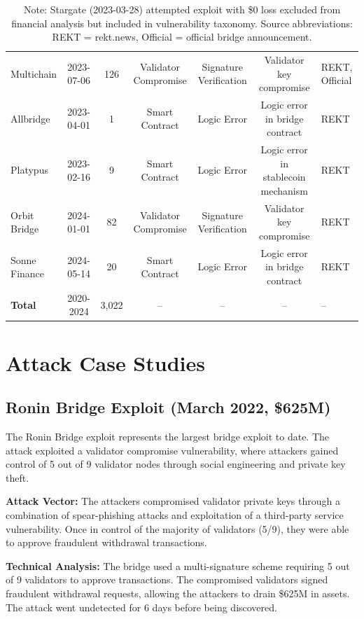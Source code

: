 \documentclass[runningheads]{llncs}
\begin{document}
\begin{table}[!ht]
\begin{tabular}{lcccccp{3.5cm}}
        Multichain & 2023-07-06 & 126 & Validator Compromise & Signature Verification & Validator key compromise & REKT, Official \\
        Allbridge & 2023-04-01 & 1 & Smart Contract & Logic Error & Logic error in bridge contract & REKT \\
        Platypus & 2023-02-16 & 9 & Smart Contract & Logic Error & Logic error in stablecoin mechanism & REKT \\
        Orbit Bridge & 2024-01-01 & 82 & Validator Compromise & Signature Verification & Validator key compromise & REKT \\
        Sonne Finance & 2024-05-14 & 20 & Smart Contract & Logic Error & Logic error in bridge contract & REKT \\
        \midrule
        \textbf{Total} & 2020-2024 & 3,022 & -- & -- & -- & -- \\
        \bottomrule
    \end{tabular}
    \caption*{\footnotesize Note: Stargate (2023-03-28) attempted exploit with \$0 loss excluded from financial analysis but included in vulnerability taxonomy. Source abbreviations: REKT = rekt.news, Official = official bridge announcement.}
\end{table}

\section{Attack Case Studies}
\label{app:attacks}

\subsection{Ronin Bridge Exploit (March 2022, \$625M)}
The Ronin Bridge exploit represents the largest bridge exploit to date. The attack exploited a validator compromise vulnerability, where attackers gained control of 5 out of 9 validator nodes through social engineering and private key theft.

\textbf{Attack Vector:} The attackers compromised validator private keys through a combination of spear-phishing attacks and exploitation of a third-party service vulnerability. Once in control of the majority of validators (5/9), they were able to approve fraudulent withdrawal transactions.

\textbf{Technical Analysis:} The bridge used a multi-signature scheme requiring 5 out of 9 validators to approve transactions. The compromised validators signed fraudulent withdrawal requests, allowing the attackers to drain \$625M in assets. The attack went undetected for 6 days before being discovered.
\end{document}

